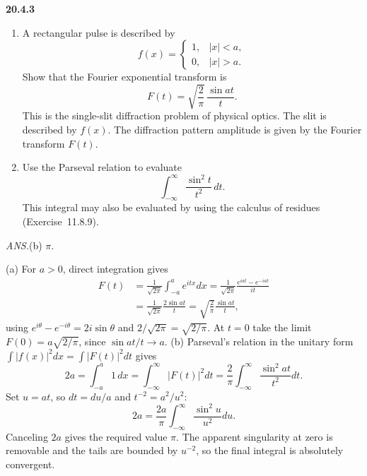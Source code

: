 \par\bigskip
\noindent\textbf{20.4.3}
\begin{enumerate}
\item[(a)] A rectangular pulse is described by
\[
f(x)=\begin{cases}
1, & |x| < a,\\
0, & |x| > a.
\end{cases}
\]
Show that the Fourier exponential transform is
\[
F(t)=\sqrt{\frac{2}{\pi}}\,\frac{\sin at}{t}.
\]
This is the single-slit diffraction problem of physical optics.
The slit is described by $f(x)$. The diffraction pattern amplitude
is given by the Fourier transform $F(t)$.
\item[(b)] Use the Parseval relation to evaluate
\[
\int_{-\infty}^{\infty}\frac{\sin^{2}t}{t^{2}}\,dt.
\]
This integral may also be evaluated by using the calculus of
residues (Exercise~11.8.9).
\end{enumerate}
\par\nobreak\hfill\emph{ANS.}\enspace(b) $\pi$.
\par{}
\solution
(a) For $a>0$, direct integration gives
\begin{align*}
F(t)&=\frac1{\sqrt{2\pi}}\int_{-a}^{a}e^{itx}dx
=\frac1{\sqrt{2\pi}}\frac{e^{iat}-e^{-iat}}{it}\\
&=\frac1{\sqrt{2\pi}}\frac{2\sin at}{t}
=\boxed{\sqrt{\frac2\pi}\frac{\sin at}{t}},
\end{align*}
using $e^{i\theta}-e^{-i\theta}=2i\sin\theta$ and
$2/\sqrt{2\pi}=\sqrt{2/\pi}$.
At $t=0$ take the limit $F(0)=a\sqrt{2/\pi}$, since
$\sin at/t\to a$.
(b) Parseval's relation in the unitary form
$\int|f(x)|^2dx=\int|F(t)|^2dt$ gives
\[
2a=\int_{-a}^a1\,dx
=\int_{-\infty}^{\infty}|F(t)|^2dt
=\frac2\pi\int_{-\infty}^{\infty}\frac{\sin^2at}{t^2}dt.
\]
Set $u=at$, so $dt=du/a$ and $t^{-2}=a^2/u^2$:
\[
2a=\frac{2a}{\pi}\int_{-\infty}^{\infty}\frac{\sin^2u}{u^2}du.
\]
Canceling $2a$ gives the required value $\boxed{\pi}$.
The apparent singularity at zero is removable and the tails are
bounded by $u^{-2}$, so the final integral is absolutely convergent.

